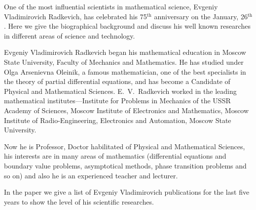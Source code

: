 \par

\theenauthorsdetails

\begin{minipage}[t]{125mm}

\vskip4mm

{\renewcommand{\bfdefault}{bx}\noindent\small\textbf{\emph{\EnAuthorInTitlepage}}\renewcommand{\bfdefault}{b}}  

\vskip2mm

{\scriptsize \enaffilname}

\end{minipage}

\vskip2mm





\footnotesize



\smallskip






One of the most influential scientists in mathematical science,  Evgeniy Vladimirovich Radkevich, has celebrated his 75$^{\text{th}}$ anniversary on the January, 26$^{\text{th}}$. Here we give the biographical background and discuss his well known researches in different areas of science and technology.



Evgeniy Vladimirovich Radkevich began his mathematical education in Moscow State University, Faculty of Mechanics and Mathematics. He has studied under Olga Arsenievna Oleinik, a famous mathematician, one of the best specialists in the theory of partial differential equations, and has become a Candidate of Physical and Mathematical Sciences. E.~V.~Radkevich worked in the leading mathematical institutes---Institute for Problems in Mechanics of the USSR Academy of Sciences, Moscow Institute of Electronics and Mathematics, Moscow Institute of Radio-Engineering, Electronics and Automation, Moscow State University. 



Now he is Professor, Doctor habilitated of Physical and Mathematical Sciences, his interests are in many areas of mathematics (differential equations and boundary value problems, asymptotical methods, phase transition problems and so on) and also he is an experienced teacher and lecturer. 



In the paper we give a list of Evgeniy Vladimirovich publications for the last five years to show the level of his scientific researches. 

